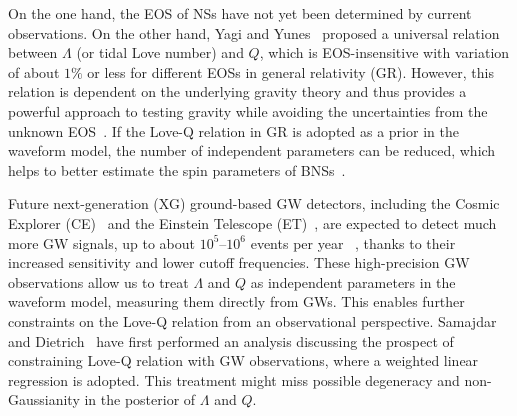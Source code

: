 \documentclass[a4paper,11pt]{article}
\begin{document}
On the one hand, the EOS of NSs have not yet been determined by current
observations. On the
other hand, Yagi 
and Yunes~\cite{Yagi:2013bca,Yagi:2013awa} proposed a universal relation between 
$\Lambda$ (or tidal Love number) and $Q$, which is EOS-insensitive 
with variation of about $1\%$ or less for different EOSs in general relativity (GR).
However, this relation is dependent on the underlying gravity theory and thus
provides a powerful approach to testing gravity while avoiding the uncertainties
from the unknown EOS~\cite{Yagi:2013bca,Silva:2020acr,Shao:2022koz}. If the Love-Q relation in GR is adopted as a prior in the waveform
model, the number of independent parameters can be reduced, which helps to
better estimate the spin parameters of BNSs~\cite{Yagi:2013bca,LIGOScientific:2018cki,
LIGOScientific:2018hze,LIGOScientific:2020aai}. 

Future next-generation (XG) ground-based GW detectors, including the Cosmic Explorer 
(CE)~\cite{Reitze:2019iox,Reitze:2019dyk} and the Einstein Telescope (ET)~\cite{Punturo:2010zz,Hild:2010id,Sathyaprakash:2012jk}, 
are expected to
 detect much more GW signals, up to about $10^5$--$10^6$ events per year
~\cite{LIGOScientific:2017zlf,Sathyaprakash:2019yqt,Kalogera:2021bya,Samajdar:2021egv}, 
thanks to their 
increased sensitivity and lower cutoff frequencies. These high-precision GW observations allow us to treat $\Lambda$ and $Q$ as independent parameters in the waveform model, measuring them directly from GWs. This enables further constraints on the Love-Q relation from an observational perspective.
Samajdar and Dietrich~\cite{Samajdar:2020xrd} 
have first performed an analysis discussing the prospect of constraining Love-Q 
relation with GW observations, where a weighted linear regression is adopted.
This treatment might miss possible degeneracy and non-Gaussianity in the posterior of $\Lambda$ and $Q$. 
\end{document}

